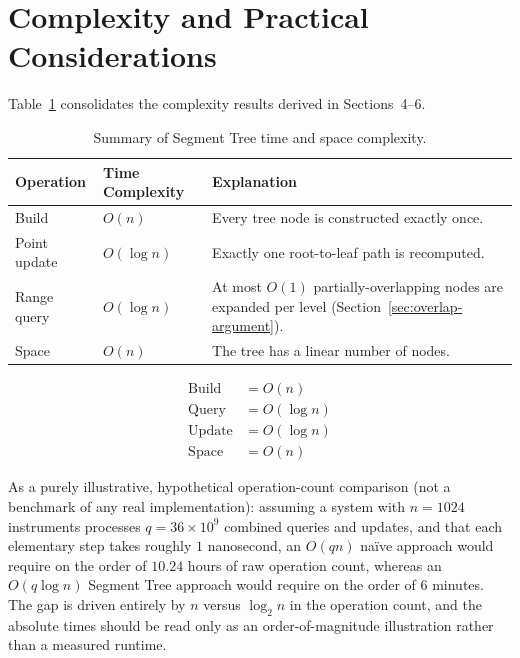\documentclass[11pt]{article}
\begin{document}
\section{Complexity and Practical Considerations}

Table~\ref{tab:summary} consolidates the complexity results derived in Sections~4--6.

\begin{table}[h]
\centering
\caption{Summary of Segment Tree time and space complexity.}
\label{tab:summary}
\begin{tabular}{llp{6.5cm}}
\toprule
\textbf{Operation} & \textbf{Time Complexity} & \textbf{Explanation} \\
\midrule
Build         & $O(n)$      & Every tree node is constructed exactly once. \\
Point update  & $O(\log n)$ & Exactly one root-to-leaf path is recomputed. \\
Range query   & $O(\log n)$ & At most $O(1)$ partially-overlapping nodes are expanded per level (Section~\ref{sec:overlap-argument}). \\
Space         & $O(n)$      & The tree has a linear number of nodes. \\
\bottomrule
\end{tabular}
\end{table}

\begin{equation}
\boxed{
\begin{aligned}
\text{Build} &= O(n) \\
\text{Query} &= O(\log n) \\
\text{Update} &= O(\log n) \\
\text{Space} &= O(n)
\end{aligned}}
\end{equation}

As a purely illustrative, hypothetical operation-count comparison (not a benchmark of any real implementation): assuming a system with $n = 1024$ instruments processes $q = 36 \times 10^9$ combined queries and updates, and that each elementary step takes roughly $1$ nanosecond, an $O(qn)$ na\"ive approach would require on the order of $10.24$ hours of raw operation count, whereas an $O(q \log n)$ Segment Tree approach would require on the order of $6$ minutes. The gap is driven entirely by $n$ versus $\log_2 n$ in the operation count, and the absolute times should be read only as an order-of-magnitude illustration rather than a measured runtime.
\end{document}
